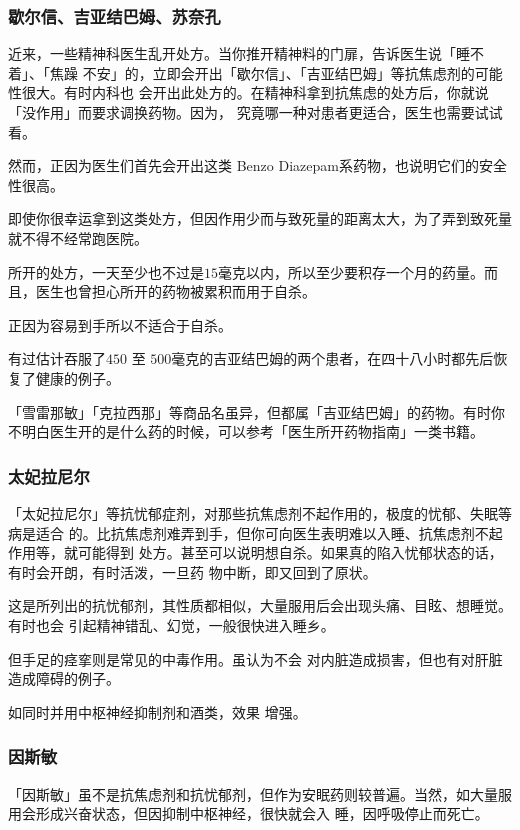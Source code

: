 \documentclass[UTF8]{ctexart}
\begin{document}
\subsubsection{歇尔信、吉亚结巴姆、苏奈孔}

近来，一些精神科医生乱开处方。当你推开精神料的门扉，告诉医生说「睡不着」、「焦躁
不安」的，立即会开出「歇尔信」、「吉亚结巴姆」等抗焦虑剂的可能性很大。有时内科也
会开出此处方的。在精神科拿到抗焦虑的处方后，你就说「没作用」而要求调换药物。因为， 究竟哪一种对患者更适合，医生也需要试试看。

然而，正因为医生们首先会开出这类 Benzo Diazepam系药物，也说明它们的安全性很高。

即使你很幸运拿到这类处方，但因作用少而与致死量的距离太大，为了弄到致死量就不得不经常跑医院。

所开的处方，一天至少也不过是$15$毫克以内，所以至少要积存一个月的药量。而且，医生也曾担心所开的药物被累积而用于自杀。

正因为容易到手所以不适合于自杀。

有过估计吞服了$450$ 至 $500$毫克的吉亚结巴姆的两个患者，在四十八小时都先后恢复了健康的例子。

「雪雷那敏」「克拉西那」等商品名虽异，但都属「吉亚结巴姆」的药物。有时你不明白医生开的是什么药的时候，可以参考「医生所开药物指南」一类书籍。 

\subsubsection{太妃拉尼尔}

「太妃拉尼尔」等抗忧郁症剂，对那些抗焦虑剂不起作用的，极度的忧郁、失眠等病是适合
的。比抗焦虑剂难弄到手，但你可向医生表明难以入睡、抗焦虑剂不起作用等，就可能得到
处方。甚至可以说明想自杀。如果真的陷入忧郁状态的话，有时会开朗，有时活泼，一旦药
物中断，即又回到了原状。

这是所列出的抗忧郁剂，其性质都相似，大量服用后会出现头痛、目眩、想睡觉。有时也会 引起精神错乱、幻觉，一般很快进入睡乡。

但手足的痉挛则是常见的中毒作用。虽认为不会 对内脏造成损害，但也有对肝脏造成障碍的例子。

如同时并用中枢神经抑制剂和酒类，效果 增强。

\subsubsection{因斯敏}

「因斯敏」虽不是抗焦虑剂和抗忧郁剂，但作为安眠药则较普遍。当然，如大量服用会形成兴奋状态，但因抑制中枢神经，很快就会入 睡，因呼吸停止而死亡。
\end{document}
